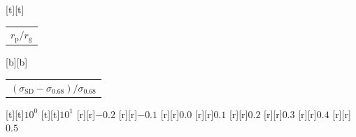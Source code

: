 %    
%
%
\begin{psfrags}%
\psfragscanon%
%
[t][t]{\color[rgb]{0,0,0}\setlength{\tabcolsep}{0pt}\begin{tabular}{c}{\Large$r_\mathrm{p}/r_\mathrm{g}$}\end{tabular}}%
[b][b]{\color[rgb]{0,0,0}\setlength{\tabcolsep}{0pt}\begin{tabular}{c}{\Large$(\sigma_\mathrm{SD}-\sigma_{0.68})/\sigma_{0.68}$}\end{tabular}}%
%
[t][t]{$10^{0}$}%
[t][t]{$10^{1}$}%
%
[r][r]{$-0.2$}%
[r][r]{$-0.1$}%
[r][r]{$0.0$}%
[r][r]{$0.1$}%
[r][r]{$0.2$}%
[r][r]{$0.3$}%
[r][r]{$0.4$}%
[r][r]{$0.5$}%
%
%
\end{psfrags}%
%
